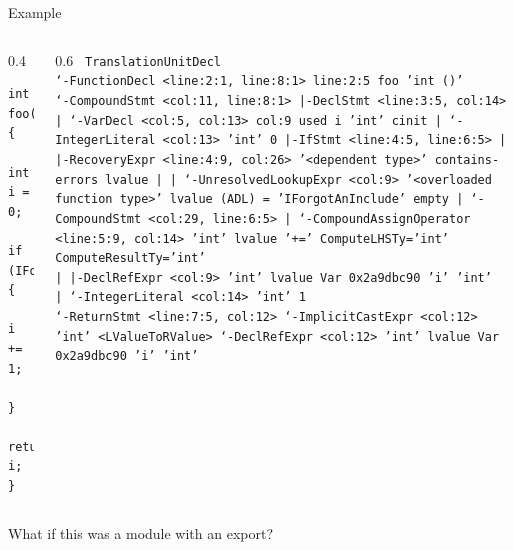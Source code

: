 \documentclass[]{beamer}
\begin{document}
\begin{frame}[containsverbatim]{Example}
  \begin{columns}
    \begin{column}{0.4\textwidth}
      \begin{verbatim}
int foo() {
    int i = 0;
    if (IForgotAnInclude()) {
        i += 1;
    }
    return i;
}
    \end{verbatim}
    \end{column}
    \begin{column}{0.6\textwidth}
      \tiny\texttt{
      TranslationUnitDecl \\
      `-FunctionDecl <line:2:1, line:8:1> line:2:5 foo 'int ()' \\
      `-CompoundStmt <col:11, line:8:1> \\
      |-DeclStmt <line:3:5, col:14> \\
      | `-VarDecl <col:5, col:13> col:9 used i 'int' cinit \\
      |   `-IntegerLiteral <col:13> 'int' 0 \\
      |-IfStmt <line:4:5, line:6:5> \\
      | |-{\color{red}RecoveryExpr <line:4:9, col:26> '<dependent type>' contains-errors} lvalue \\
      | | `-{\color{purple}UnresolvedLookupExpr <col:9> '<overloaded function type>' lvalue (ADL) = 'IForgotAnInclude' empty} \\
      | `-CompoundStmt <col:29, line:6:5> \\
      |   `-CompoundAssignOperator <line:5:9, col:14> 'int' lvalue '+=' ComputeLHSTy='int' ComputeResultTy='int' \\
      |     |-DeclRefExpr <col:9> 'int' lvalue Var 0x2a9dbc90 'i' 'int' \\
      |     `-IntegerLiteral <col:14> 'int' 1 \\
      `-ReturnStmt <line:7:5, col:12> \\
      `-ImplicitCastExpr <col:12> 'int' <LValueToRValue> \\
      `-DeclRefExpr <col:12> 'int' lvalue Var 0x2a9dbc90 'i' 'int'
      }
    \end{column}
  \end{columns}
  \vspace{1em}
  \begin{center}
    \small What if this was a module with an export?
  \end{center}
\end{frame}
\end{document}
